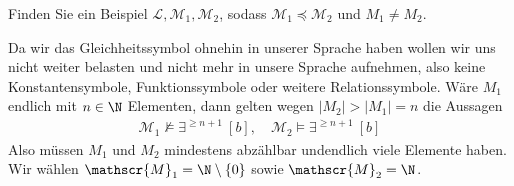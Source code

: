 
\begin{exercise}[143]
Finden Sie ein Beispiel $\mathscr{L},\mathscr{M}_1,\mathscr{M}_2$, sodass
$\mathscr{M}_1 \preccurlyeq \mathscr{M}_2$ und $M_1 \neq M_2$.
\end{exercise}

\begin{solution}
	Da wir das Gleichheitssymbol ohnehin in unserer Sprache haben wollen wir uns nicht weiter belasten und nicht mehr in unsere Sprache aufnehmen, also keine Konstantensymbole, Funktionssymbole oder weitere Relationssymbole. Wäre $M_1$ endlich mit $n \in \N$ Elementen, dann gelten wegen $ |M_2| > |M_1| = n$ die Aussagen
	\begin{align*}
	\mathscr{M}_1 \nvDash \exists^{\geq n + 1} \ [b], \quad \mathscr{M}_2 \vDash \exists^{\geq n + 1} \ [b]
	\end{align*}
	 Also müssen $M_1$ und $M_2$ mindestens abzählbar undendlich viele Elemente haben. Wir wählen $\mathscr{M}_1 = \N \setminus \{0\}$ sowie $\mathscr{M}_2 = \N$.
\end{solution}
